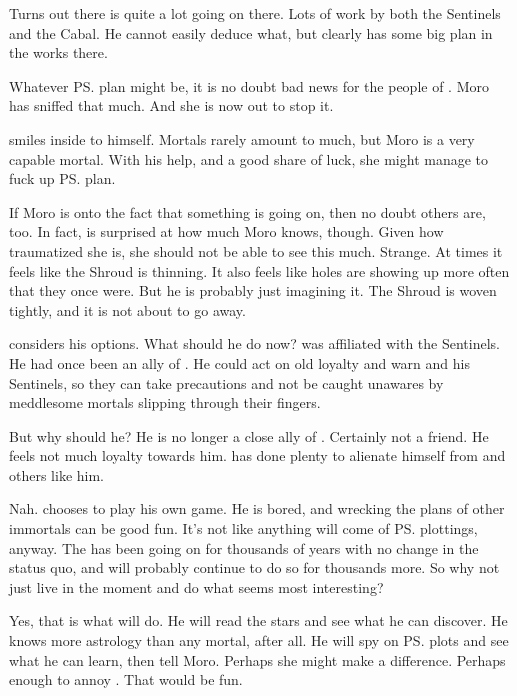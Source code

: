 Turns out there is quite a lot going on there. 
Lots of work by both the Sentinels and the Cabal. 
He cannot easily deduce what, but \Secherdamon clearly has some big plan in the works there. 

Whatever \ps{\Secherdamon} plan might be, it is no doubt bad news for the people of \Malcur. 
Moro has sniffed that much. 
And she is now out to stop it. 

\Nasshikerr smiles inside to himself. 
Mortals rarely amount to much, but Moro \Cornel is a very capable mortal. 
With his help, and a good share of luck, she might manage to fuck up \ps{\Secherdamon} plan. 

If Moro is onto the fact that something is going on, then no doubt others are, too. 
In fact, \Nasshikerr{} is surprised at how much Moro knows, though. 
Given how traumatized she is, she should not be able to see this much. 
Strange. 
At times it feels like the Shroud is thinning. 
It also feels like holes are showing up more often that they once were. 
But he is probably just imagining it. 
The Shroud is woven tightly, and it is not about to go away. 

\Nasshikerr considers his options. 
What should he do now? 
\Nasshikerr was affiliated with the Sentinels. 
He had once been an ally of \Secherdamon. 
He could act on old loyalty and warn \Secherdamon and his Sentinels, so they can take precautions and not be caught unawares by meddlesome mortals slipping through their fingers. 

But why should he?
He is no longer a close ally of \Secherdamon. 
Certainly not a friend. 
He feels not much loyalty towards him. 
\Secherdamon has done plenty to alienate himself from \Nasshikerr and others like him. 

Nah. 
\Nasshikerr chooses to play his own game. 
He is bored, and wrecking the plans of other immortals can be good fun. 
It's not like anything will come of \ps{\Secherdamon} plottings, anyway. 
The \feud has been going on for thousands of years with no change in the status quo, and will probably continue to do so for thousands more. 
So why not just live in the moment and do what seems most interesting?

Yes, that is what \Nasshikerr will do. 
He will read the stars and see what he can discover. 
He knows more astrology than any mortal, after all. 
He will spy on \ps{\Secherdamon} plots and see what he can learn, then tell Moro. 
Perhaps she might make a difference. 
Perhaps enough to annoy \Secherdamon. 
That would be fun. 









